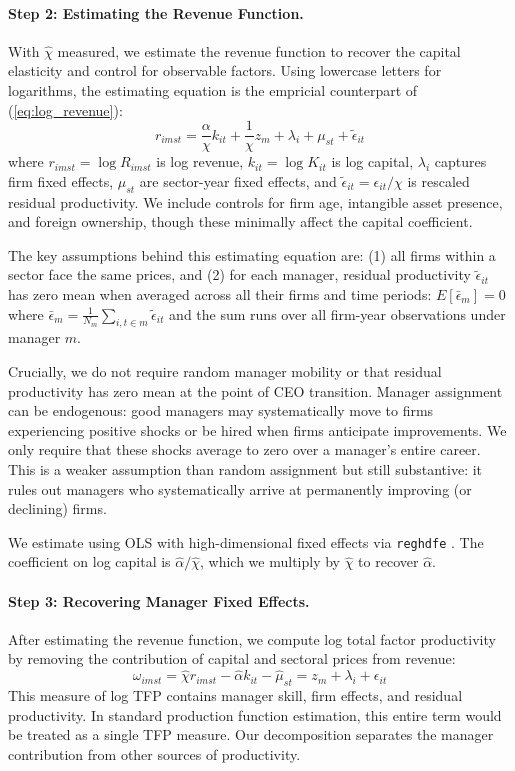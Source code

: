 \documentclass[11pt,a4paper]{article}
\begin{document}
\paragraph{Step 2: Estimating the Revenue Function.} With $\hat{\chi}$ measured, we estimate the revenue function to recover the capital elasticity and control for observable factors. Using lowercase letters for logarithms, the estimating equation is the empricial counterpart of (\ref{eq:log_revenue}):
\begin{equation}
r_{imst} = \frac{\alpha}{\chi} k_{it} + \frac{1}{\chi}z_m + \lambda_i + \mu_{st} + \tilde{\epsilon}_{it}
\end{equation}
where $r_{imst} = \log R_{imst}$ is log revenue, $k_{it} = \log K_{it}$ is log capital, $\lambda_i$ captures firm fixed effects, $\mu_{st}$ are sector-year fixed effects, and $\tilde{\epsilon}_{it} = \epsilon_{it}/\chi$ is rescaled residual productivity. We include controls for firm age, intangible asset presence, and foreign ownership, though these minimally affect the capital coefficient.

The key assumptions behind this estimating equation are: (1) all firms within a sector face the same prices, and (2) for each manager, residual productivity $\tilde{\epsilon}_{it}$ has zero mean when averaged across all their firms and time periods: $E[\bar{\epsilon}_m] = 0$ where $\bar{\epsilon}_m = \frac{1}{N_m}\sum_{i,t \in m} \tilde{\epsilon}_{it}$ and the sum runs over all firm-year observations under manager $m$.

Crucially, we do not require random manager mobility or that residual productivity has zero mean at the point of CEO transition. Manager assignment can be endogenous: good managers may systematically move to firms experiencing positive shocks or be hired when firms anticipate improvements. We only require that these shocks average to zero over a manager's entire career. This is a weaker assumption than random assignment but still substantive: it rules out managers who systematically arrive at permanently improving (or declining) firms.

We estimate using OLS with high-dimensional fixed effects via \texttt{reghdfe} \citep{reghdfe}. The coefficient on log capital is $\hat{\alpha}/\hat{\chi}$, which we multiply by $\hat{\chi}$ to recover $\hat{\alpha}$.

\paragraph{Step 3: Recovering Manager Fixed Effects.} After estimating the revenue function, we compute log total factor productivity by removing the contribution of capital and sectoral prices from revenue:
\begin{equation}
\omega_{imst} = \hat{\chi} r_{imst} - \hat{\alpha} k_{it} - \hat{\mu}_{st} = z_m + \lambda_i + \epsilon_{it}
\end{equation}
This measure of log TFP contains manager skill, firm effects, and residual productivity. In standard production function estimation, this entire term would be treated as a single TFP measure. Our decomposition separates the manager contribution from other sources of productivity.
\end{document}
